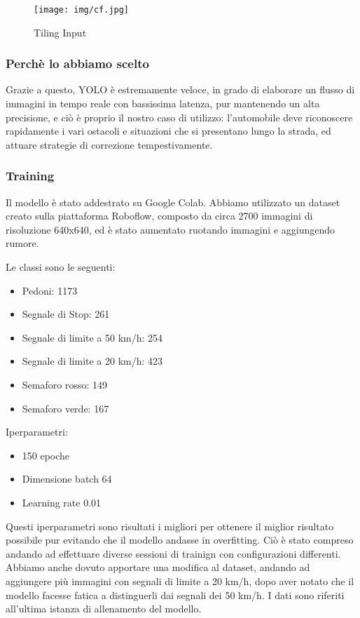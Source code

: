 \documentclass{article}
\begin{document}
\begin{figure}[h!]
    \centering
    \texttt{[image: img/cf.jpg]}
    \caption{Tiling Input}
\end{figure}

\subsubsection{Perchè lo abbiamo scelto}
Grazie a questo, YOLO è estremamente veloce, in grado di elaborare un flusso di immagini in tempo reale con bassissima latenza, pur mantenendo un alta precisione, e ciò è proprio il nostro caso di utilizzo: l'automobile deve riconoscere rapidamente i vari ostacoli e situazioni che si presentano lungo la strada, ed attuare strategie di correzione tempestivamente.

\subsubsection{Training}

  Il modello è stato addestrato su Google Colab.
  Abbiamo utilizzato un dataset creato sulla piattaforma Roboflow, composto da circa 2700 immagini di risoluzione 640x640, ed è stato aumentato ruotando immagini e aggiungendo rumore.
  
  Le classi sono le seguenti:
  \begin{itemize}
    \item Pedoni: 1173
    \item Segnale di Stop: 261
    \item Segnale di limite a 50 km/h: 254
    \item Segnale di limite a 20 km/h: 423
    \item Semaforo rosso: 149
    \item Semaforo verde: 167
  \end{itemize}
  
  Iperparametri:
  \begin{itemize}
    \item 150 epoche
    \item Dimensione batch 64
    \item Learning rate 0.01
  \end{itemize}

  Questi iperparametri sono risultati i migliori per ottenere il miglior risultato possibile pur evitando che il modello andasse in overfitting. Ciò è stato compreso andando ad effettuare diverse sessioni di trainign con configurazioni differenti.
  Abbiamo anche dovuto apportare una modifica al dataset, andando ad aggiungere più immagini con segnali di limite a 20 km/h, dopo aver notato che il modello facesse fatica a distinguerli dai segnali dei 50 km/h.
  I dati sono riferiti all'ultima istanza di allenamento del modello.
\end{document}
